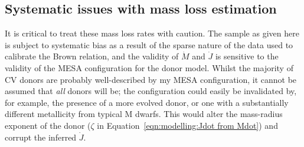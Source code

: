 \subsection{Systematic issues with mass loss estimation}
\label{sect:massloss and AML:systematic bias}

It is critical to treat these mass loss rates with caution.
The sample as given here is subject to systematic bias as a result of the sparse nature of the data used to calibrate the Brown relation, and the validity of $\dot M$ and $\dot J$ is sensitive to the validity of the MESA configuration for the donor model.
Whilst the majority of CV donors are probably well-described by my MESA configuration, it cannot be assumed that \textit{all} donors will be; the configuration could easily be invalidated by, for example, the presence of a more evolved donor, or one with a substantially different metallicity from typical M dwarfs.
This would alter the mass-radius exponent of the donor ($\zeta$ in Equation~\ref{eqn:modelling:Jdot from Mdot}) and corrupt the inferred $\dot J$.

